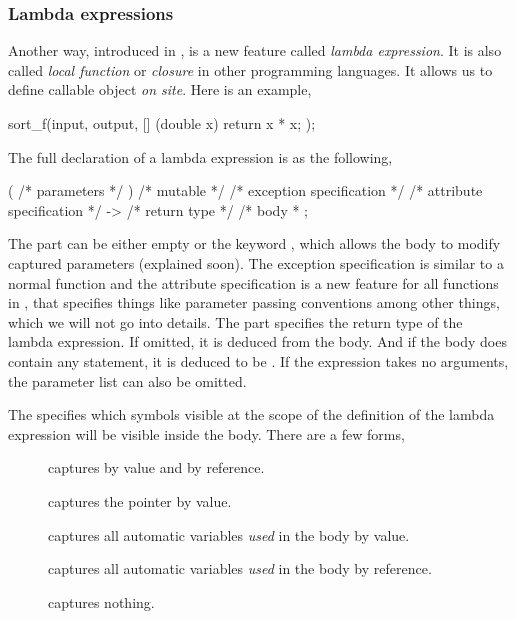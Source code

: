 \subsubsection{Lambda expressions}
\label{ssub:Lambda expressions}

Another way, introduced in \cppoo, is a new feature called \emph{lambda
  expression}. It is also called \emph{local function} or \emph{closure} in
other programming languages. It allows us to define callable object \emph{on
  site}. Here is an example,
\begin{cppcode}
sort_f(input, output, [] (double x) { return x * x; });
\end{cppcode}
The full declaration of a lambda expression is as the following,
\begin{cppcode}
[ /* capture */ ] ( /* parameters */ ) /* mutable */
/* exception specification */
/* attribute specification */
-> /* return type */ { /* body * };
\end{cppcode}
The  part can be either empty or the keyword
, which allows the body to modify captured parameters
(explained soon). The exception specification is similar to a normal function
and the attribute specification is a new feature for all functions in \cppoo,
that specifies things like parameter passing conventions among other things,
which we will not go into details. The part 
specifies the return type of the lambda expression. If omitted, it is deduced
from the body. And if the body does contain any  statement,
it is deduced to be . If the expression takes no arguments,
the parameter list can also be omitted.

The  specifies which symbols visible at the scope of
the definition of the lambda expression will be visible inside the body. There
are a few forms,
\begin{description}
  \item[\cppinline{[a, &b]}] captures  by value and 
    by reference.
  \item[\cppinline{[this]}] captures the  pointer by value.
  \item[\cppinline{[=]}] captures all automatic variables \emph{used} in the
    body by value.
  \item[\cppinline{[&]}] captures all automatic variables \emph{used} in the
    body by reference.
  \item[\cppinline{[]}] captures nothing.
\end{description}


